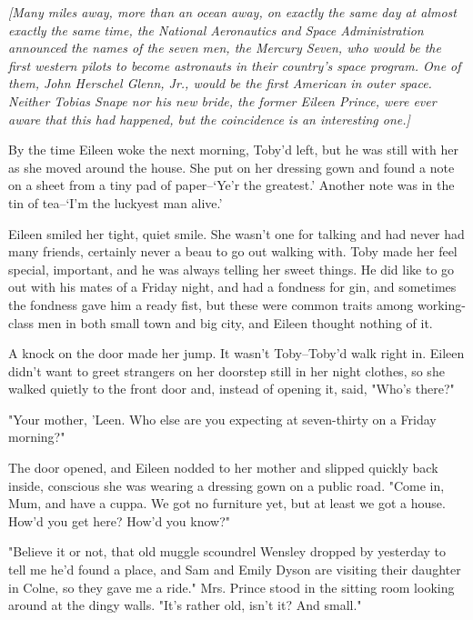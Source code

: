 \vspace{\baselineskip}

\emph{[Many miles away, more than an ocean away, on exactly the same day at almost exactly the same time, the National Aeronautics and Space Administration announced the names of the seven men, the Mercury Seven, who would be the first western pilots to become astronauts in their country's space program. One of them, John Herschel Glenn, Jr., would be the first American in outer space. Neither Tobias Snape nor his new bride, the former Eileen Prince, were ever aware that this had happened, but the coincidence is an interesting one.]}

\vspace{\baselineskip}

By the time Eileen woke the next morning, Toby'd left, but he was still with her as she moved around the house. She put on her dressing gown and found a note on a sheet from a tiny pad of paper–`Ye'r the greatest.' Another note was in the tin of tea–`I'm the luckyest man alive.'

Eileen smiled her tight, quiet smile. She wasn't one for talking and had never had many friends, certainly never a beau to go out walking with. Toby made her feel special, important, and he was always telling her sweet things. He did like to go out with his mates of a Friday night, and had a fondness for gin, and sometimes the fondness gave him a ready fist, but these were common traits among working-class men in both small town and big city, and Eileen thought nothing of it.

A knock on the door made her jump. It wasn't Toby–Toby'd walk right in. Eileen didn't want to greet strangers on her doorstep still in her night clothes, so she walked quietly to the front door and, instead of opening it, said, "Who's there?"

"Your mother, 'Leen. Who else are you expecting at seven-thirty on a Friday morning?"

The door opened, and Eileen nodded to her mother and slipped quickly back inside, conscious she was wearing a dressing gown on a public road. "Come in, Mum, and have a cuppa. We got no furniture yet, but at least we got a house. How'd you get here? How'd you know?"

"Believe it or not, that old muggle scoundrel Wensley dropped by yesterday to tell me he'd found a place, and Sam and Emily Dyson are visiting their daughter in Colne, so they gave me a ride." Mrs. Prince stood in the sitting room looking around at the dingy walls. "It's rather old, isn't it? And small."

